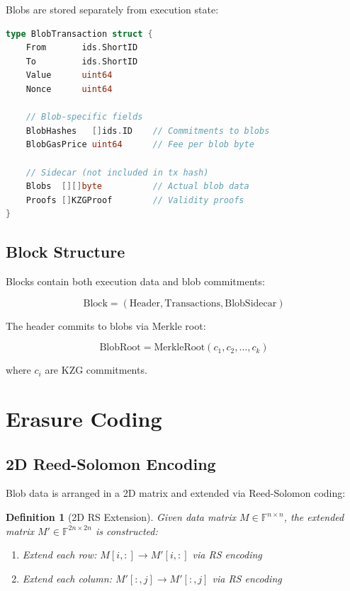 \documentclass[11pt,a4paper]{article}
\newtheorem{definition}{Definition}
\begin{document}
Blobs are stored separately from execution state:

\begin{lstlisting}[language=Go, caption=Blob transaction structure]
type BlobTransaction struct {
    From       ids.ShortID
    To         ids.ShortID
    Value      uint64
    Nonce      uint64

    // Blob-specific fields
    BlobHashes   []ids.ID    // Commitments to blobs
    BlobGasPrice uint64      // Fee per blob byte

    // Sidecar (not included in tx hash)
    Blobs  [][]byte          // Actual blob data
    Proofs []KZGProof        // Validity proofs
}
\end{lstlisting}

\subsection{Block Structure}

Blocks contain both execution data and blob commitments:

\begin{equation}
    \text{Block} = (\text{Header}, \text{Transactions}, \text{BlobSidecar})
\end{equation}

The header commits to blobs via Merkle root:

\begin{equation}
    \text{BlobRoot} = \text{MerkleRoot}(c_1, c_2, \ldots, c_k)
\end{equation}

where $c_i$ are KZG commitments.

\section{Erasure Coding}

\subsection{2D Reed-Solomon Encoding}

Blob data is arranged in a 2D matrix and extended via Reed-Solomon coding:

\begin{definition}[2D RS Extension]
Given data matrix $M \in \mathbb{F}^{n \times n}$, the extended matrix $M' \in \mathbb{F}^{2n \times 2n}$ is constructed:
\begin{enumerate}
    \item Extend each row: $M[i,:] \to M'[i,:]$ via RS encoding
    \item Extend each column: $M'[:,j] \to M'[:,j]$ via RS encoding
\end{enumerate}
\end{definition}
\end{document}
